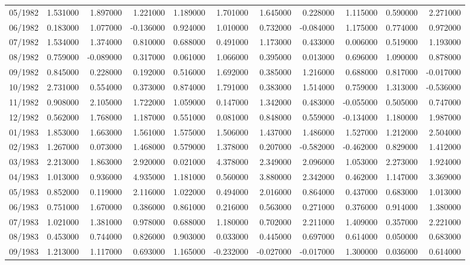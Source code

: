 \begin{tabular}{lrrrrrrrrrr}
05/1982 & 1.531000 & 1.897000 & 1.221000 & 1.189000 & 1.701000 & 1.645000 & 0.228000 & 1.115000 & 0.590000 & 2.271000 \\
06/1982 & 0.183000 & 1.077000 & -0.136000 & 0.924000 & 1.010000 & 0.732000 & -0.084000 & 1.175000 & 0.774000 & 0.972000 \\
07/1982 & 1.534000 & 1.374000 & 0.810000 & 0.688000 & 0.491000 & 1.173000 & 0.433000 & 0.006000 & 0.519000 & 1.193000 \\
08/1982 & 0.759000 & -0.089000 & 0.317000 & 0.061000 & 1.066000 & 0.395000 & 0.013000 & 0.696000 & 1.090000 & 0.878000 \\
09/1982 & 0.845000 & 0.228000 & 0.192000 & 0.516000 & 1.692000 & 0.385000 & 1.216000 & 0.688000 & 0.817000 & -0.017000 \\
10/1982 & 2.731000 & 0.554000 & 0.373000 & 0.874000 & 1.791000 & 0.383000 & 1.514000 & 0.759000 & 1.313000 & -0.536000 \\
11/1982 & 0.908000 & 2.105000 & 1.722000 & 1.059000 & 0.147000 & 1.342000 & 0.483000 & -0.055000 & 0.505000 & 0.747000 \\
12/1982 & 0.562000 & 1.768000 & 1.187000 & 0.551000 & 0.081000 & 0.848000 & 0.559000 & -0.134000 & 1.180000 & 1.987000 \\
01/1983 & 1.853000 & 1.663000 & 1.561000 & 1.575000 & 1.506000 & 1.437000 & 1.486000 & 1.527000 & 1.212000 & 2.504000 \\
02/1983 & 1.267000 & 0.073000 & 1.468000 & 0.579000 & 1.378000 & 0.207000 & -0.582000 & -0.462000 & 0.829000 & 1.412000 \\
03/1983 & 2.213000 & 1.863000 & 2.920000 & 0.021000 & 4.378000 & 2.349000 & 2.096000 & 1.053000 & 2.273000 & 1.924000 \\
04/1983 & 1.013000 & 0.936000 & 4.935000 & 1.181000 & 0.560000 & 3.880000 & 2.342000 & 0.462000 & 1.147000 & 3.369000 \\
05/1983 & 0.852000 & 0.119000 & 2.116000 & 1.022000 & 0.494000 & 2.016000 & 0.864000 & 0.437000 & 0.683000 & 1.013000 \\
06/1983 & 0.751000 & 1.670000 & 0.386000 & 0.861000 & 0.216000 & 0.563000 & 0.271000 & 0.376000 & 0.914000 & 1.380000 \\
07/1983 & 1.021000 & 1.381000 & 0.978000 & 0.688000 & 1.180000 & 0.702000 & 2.211000 & 1.409000 & 0.357000 & 2.221000 \\
08/1983 & 0.453000 & 0.744000 & 0.826000 & 0.903000 & 0.033000 & 0.445000 & 0.697000 & 0.614000 & 0.050000 & 0.683000 \\
09/1983 & 1.213000 & 1.117000 & 0.693000 & 1.165000 & -0.232000 & -0.027000 & -0.017000 & 1.300000 & 0.036000 & 0.614000 \\

\end{tabular}
